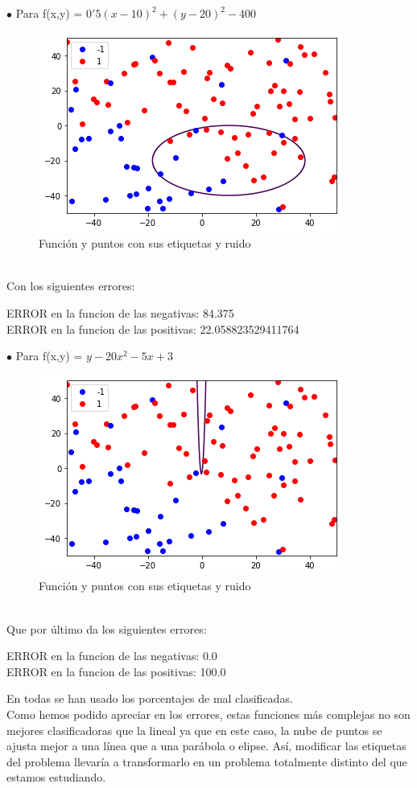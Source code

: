 \documentclass[12pt]{article}
\begin{document}
$ \bullet $ Para f(x,y) = $ 0'5(x - 10)^{2} + (y - 20)^{2} - 400 $
\begin{figure}[h]
\centering
\includegraphics[scale=0.75]{Images/Ej2cc.png} 
\caption{Función y puntos con sus etiquetas y ruido}
\label{etiqueta}
\end{figure}
\\
Con los siguientes errores:
\begin{center}
ERROR en la funcion de las negativas: 84.375\\
ERROR en la funcion de las positivas: 22.058823529411764
\end{center}

$ \bullet $ Para f(x,y) = $ y - 20x^{2} - 5x + 3 $
\begin{figure}[h]
\centering
\includegraphics[scale=0.75]{Images/Ej2cd.png} 
\caption{Función y puntos con sus etiquetas y ruido}
\label{etiqueta}
\end{figure}
\\
Que por último da los siguientes errores:
\begin{center}
ERROR en la funcion de las negativas: 0.0 \\
ERROR en la funcion de las positivas: 100.0
\end{center}
En todas se han usado los porcentajes de mal clasificadas.\\
Como hemos podido apreciar en los errores, estas funciones más complejas no son mejores clasificadoras que la lineal ya que en este caso, la nube de puntos se ajusta mejor a una línea que a una parábola o elipse. Así, modificar las etiquetas del problema llevaría a transformarlo en un problema totalmente distinto del que estamos estudiando.
\end{document}
